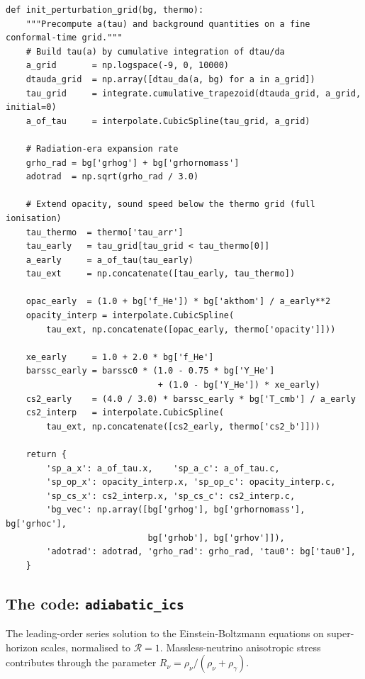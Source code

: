 \begin{codebox}
\begin{lstlisting}[style=python]
def init_perturbation_grid(bg, thermo):
    """Precompute a(tau) and background quantities on a fine conformal-time grid."""
    # Build tau(a) by cumulative integration of dtau/da
    a_grid       = np.logspace(-9, 0, 10000)
    dtauda_grid  = np.array([dtau_da(a, bg) for a in a_grid])
    tau_grid     = integrate.cumulative_trapezoid(dtauda_grid, a_grid, initial=0)
    a_of_tau     = interpolate.CubicSpline(tau_grid, a_grid)

    # Radiation-era expansion rate
    grho_rad = bg['grhog'] + bg['grhornomass']
    adotrad  = np.sqrt(grho_rad / 3.0)

    # Extend opacity, sound speed below the thermo grid (full ionisation)
    tau_thermo  = thermo['tau_arr']
    tau_early   = tau_grid[tau_grid < tau_thermo[0]]
    a_early     = a_of_tau(tau_early)
    tau_ext     = np.concatenate([tau_early, tau_thermo])

    opac_early  = (1.0 + bg['f_He']) * bg['akthom'] / a_early**2
    opacity_interp = interpolate.CubicSpline(
        tau_ext, np.concatenate([opac_early, thermo['opacity']]))

    xe_early     = 1.0 + 2.0 * bg['f_He']
    barssc_early = barssc0 * (1.0 - 0.75 * bg['Y_He']
                              + (1.0 - bg['Y_He']) * xe_early)
    cs2_early    = (4.0 / 3.0) * barssc_early * bg['T_cmb'] / a_early
    cs2_interp   = interpolate.CubicSpline(
        tau_ext, np.concatenate([cs2_early, thermo['cs2_b']]))

    return {
        'sp_a_x': a_of_tau.x,    'sp_a_c': a_of_tau.c,
        'sp_op_x': opacity_interp.x, 'sp_op_c': opacity_interp.c,
        'sp_cs_x': cs2_interp.x, 'sp_cs_c': cs2_interp.c,
        'bg_vec': np.array([bg['grhog'], bg['grhornomass'], bg['grhoc'],
                            bg['grhob'], bg['grhov']]),
        'adotrad': adotrad, 'grho_rad': grho_rad, 'tau0': bg['tau0'],
    }
\end{lstlisting}
\end{codebox}

\subsection{The code: \texttt{adiabatic\_ics}}

The leading-order series solution to the Einstein-Boltzmann equations on super-horizon scales, normalised to $\mathcal{R} = 1$. Massless-neutrino anisotropic stress contributes through the parameter $R_\nu = \rho_\nu/(\rho_\nu + \rho_\gamma)$.

